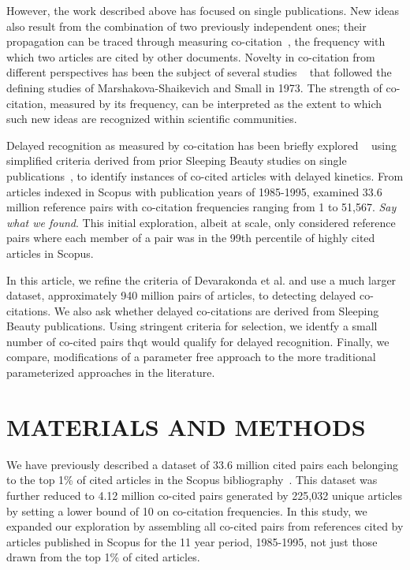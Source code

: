\documentclass[utf8]{frontiersSCNS}
\begin{document}
However, the work described above has focused on single publications. New ideas also result from the combination of two previously independent ones; their propagation can be traced through measuring co-citation~\citep{MarshakovaShaikevich1973,Small1973}, the frequency with which two articles are cited by other documents. Novelty in co-citation from different perspectives has been the subject of several studies ~\citep{Uzzi2013,Boyack2014,Wang2017,Bradley2020} that followed the defining studies of Marshakova-Shaikevich and Small in 1973. The strength of co-citation, measured by its frequency, can be interpreted as the extent to which such new ideas are recognized within scientific communities.  

Delayed recognition as measured by co-citation has been briefly explored ~\citep{devarakonda_2020} using simplified criteria derived from prior Sleeping Beauty studies on single publications~\citep{Ke2015,Raan2004,Raan2019}, to identify instances of co-cited articles with delayed kinetics. From articles indexed in Scopus with publication years of 1985-1995, \cite{devarakonda_2020} examined 33.6 million reference pairs with co-citation frequencies ranging from 1 to 51,567.  \emph{Say what we found}. This initial exploration, albeit at scale, only considered reference pairs where each member of a pair was in the 99th percentile of highly cited articles in Scopus.

In this article, we refine the criteria of Devarakonda et al. and use a much larger dataset, approximately 940 million pairs of articles, to detecting delayed co-citations. We also ask whether delayed co-citations are derived from Sleeping Beauty publications. Using stringent criteria for selection, we identfy a small number of co-cited pairs thqt would qualify for delayed recognition. Finally, we compare, modifications of a parameter free approach to the more traditional parameterized approaches in the literature.

\section{MATERIALS AND METHODS}

We have previously described a dataset of 33.6 million cited pairs each belonging to the top 1\% of cited articles in the Scopus bibliography~\citep[Figure~2]{devarakonda_2020}. This dataset was further reduced to 4.12 million co-cited pairs generated by 225,032 unique articles by setting a lower bound of 10 on co-citation frequencies. In this study, we expanded our exploration by assembling all co-cited pairs from references cited by articles published in Scopus for the 11 year period, 1985-1995, not just those drawn from the top 1\% of cited articles. 
\end{document}
